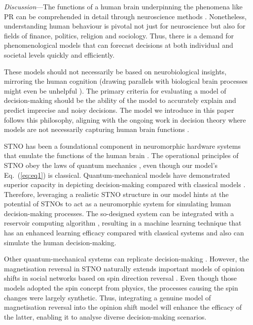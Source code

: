 \documentclass[aps,prl,reprint,superscriptaddress]{revtex4-2}
\begin{document}
{\it Discussion}---The functions of a human brain underpinning the phenomena like PR can be comprehended in detail through neuroscience methods \cite{Sha21}. Nonetheless, understanding human behaviour is pivotal not just for neuroscience but also for fields of finance, politics, religion and sociology. Thus, there is a demand for phenomenological models that can forecast decisions at both individual and societal levels quickly and efficiently.

These models should not necessarily be based on neurobiological insights, mirroring the human cognition (drawing parallels with biological brain processes might even be unhelpful \cite{Tad16}). The primary criteria for evaluating a model of decision-making should be the ability of the model to accurately explain and predict imprecise and noisy decisions. The model we introduce in this paper follows this philosophy, aligning with the ongoing work in decision theory where models are not necessarily capturing human brain functions \cite{wakker2010prospect}.

STNO has been a foundational component in neuromorphic hardware systems that emulate the functions of the human brain \cite{Fur18, Rio19}. The operational principles of STNO obey the laws of quantum mechanics \cite{Bra22}, even though our model's Eq.~(\ref{eq:eq1}) is classical. Quantum-mechanical models have demonstrated superior capacity in depicting decision-making compared with classical models \cite{Bus12}. Therefore, leveraging a realistic STNO structure in our model hints at the potential of STNOs to act as a neuromorphic system for simulating human decision-making processes. The so-designed system can be integrated with a reservoir computing algorithm \cite{Mak23_review}, resulting in a machine learning technique that has an enhanced learning efficacy compared with classical systems \cite{Dud23} and also can simulate the human decision-making. 

Other quantum-mechanical systems can replicate decision-making \cite{Nar14}. However, the magnetisation reversal in STNO naturally extends important models of opinion shifts in social networks based on spin direction reversal \cite{Red19}. Even though those models adopted the spin concept from physics, the processes causing the spin changes were largely synthetic. Thus, integrating a genuine model of magnetisation reversal into the opinion shift model \cite{Red19} will enhance the efficacy of the latter, enabling it to analyse diverse decision-making scenarios.
\end{document}
